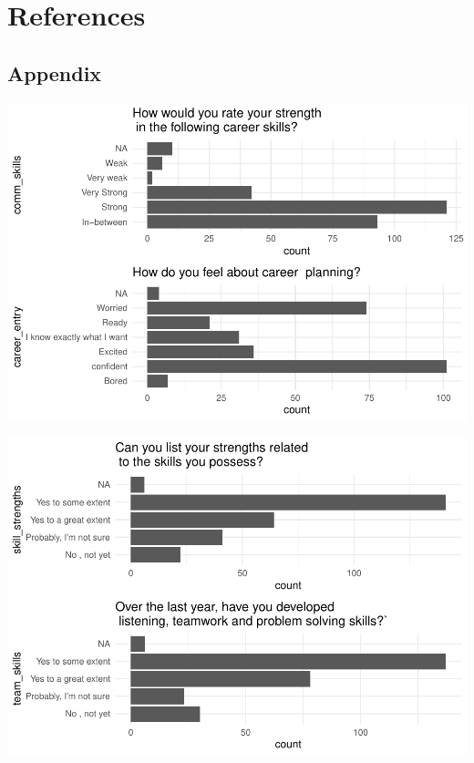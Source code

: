 \documentclass[
]{aft}
\begin{document}
\hypertarget{references}{%
\section{References}\label{references}}

\hypertarget{appendix}{%
\subsection{Appendix}\label{appendix}}

\includegraphics{journal_article_files/figure-pdf/unnamed-chunk-16-1.pdf}

\includegraphics{journal_article_files/figure-pdf/unnamed-chunk-16-2.pdf}
\end{document}
